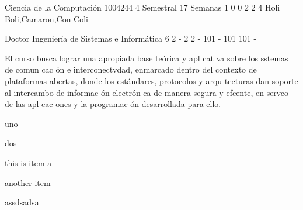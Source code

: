 \documentclass[a4paper,8pt]{article}
\date{}
\begin{document}


\sylabusHeader

\academicaTable
{Ciencia de la Computación} %
{1004244} %
{4} %
{Semestral} %
{17 Semanas} %
{1} %
{0} %
{0} %
{2}  %
{2} %
{4} %
{Holi Boli,Camaron,Con Coli} %

\administrativaTable
{Doctor} %
{Ingeniería de Sistemas e Informática} %
{6} %
{2} %
{-} %
{2} %
{2} %
{-} %
{101} %
{-} %
{101} %
{101} %
{-} %


\begin{argue}
El curso busca lograr una apropiada base te\'orica $\mathrm{y}$ apl cat va sobre los sstemas de comun cac ón $\mathrm{e}$ interconectvdad, enmarcado dentro del contexto de plataformas abertas, donde los estándares, protocolos $\mathrm{y}$ arqu tecturas dan soporte al intercambo de informac ón electrón ca de manera segura $\mathrm{y}$ efcente, en servco de las apl cac ones $\mathrm{y}$ la programac ón desarrollada para ello.
\end{argue}

\begin{sumilla}
\item uno
\item dos
\end{sumilla}

\begin{competenciasAsignatura}
\item this is item a
\item another item
\item assdsadsa
\end{competenciasAsignatura}

\begin{contenidos}
\end{contenidos}
\end{document}
